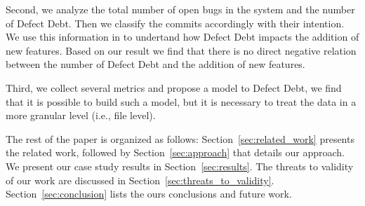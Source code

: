 Second, we analyze the total number of open bugs in the system and the number of Defect Debt. Then we classify the commits accordingly with their intention. We use this information in to undertand how Defect Debt impacts the addition of new features. Based on our result we find that there is no direct negative relation between the number of Defect Debt and the addition of new features. 

Third, we collect several metrics and propose a model to Defect Debt, we find that it is possible to build such a model, but it is necessary to treat the data in a more granular level (i.e., file level). 

The rest of the paper is organized as follows: Section~\ref{sec:related_work} presents the related work, followed by Section~\ref{sec:approach} that details our approach. We present our case study results in Section~\ref{sec:results}. The threats to validity of our work are discussed in Section~\ref{sec:threats_to_validity}. Section~\ref{sec:conclusion} lists the ours conclusions and future work. 
